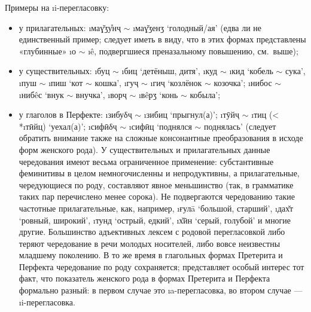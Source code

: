 Примеры на \i{i}-перегласовку:

\begin{itemize}
	\item{у прилагательных: \i{маɣ̌ӡу̊нҷ} $\sim$ \i{маɣ̌ӡенӡ} ‘голодный/ая’ (едва ли не единственный пример; следует иметь в виду, что в этих формах представлены «глубинные» \i{о} $\sim$ \i{ê}, подвергшиеся преназальному повышению, см.~выше);}
	\item{у существительных: \i{буц} $\sim$ \i{биц} ‘детёныш, дитя’, \i{куд} $\sim$ \i{кид} ‘кобель $\sim$ сука’, \i{пуш} $\sim$ \i{пиш} ‘кот $\sim$ кошка’, \i{гуҷ} $\sim$ \i{гиҷ} ‘козлёнок $\sim$ козочка’; \i{нибос} $\sim$ \i{нибêс} ‘внук $\sim$ внучка’, \i{ворҷ} $\sim$ \i{вêрӡ} ‘конь $\sim$ кобыла’;}
	\item{у глаголов в Перфекте: \i{зибуδҷ} $\sim$ \i{зибиц} ‘прыгнул(а)’; \i{тӯйҷ} $\sim$ \i{тиц} (< *\i{тӣйц}) ‘уехал(а)’; \i{сифӣδҷ} $\sim$ \i{сифӣц} ‘поднялся $\sim$ поднялась’ (следует обратить внимание также на сложные консонантные преобразования в исходе форм женского рода). У существительных и прилагательных данные чередования имеют весьма ограниченное применение: субстантивные феминитивы в целом немногочисленны и непродуктивны, а прилагательные, чередующиеся по роду, составляют явное меньшинство (так, в грамматике \parencite{karamshoev1963} таких пар перечислено менее сорока). Не подвергаются чередованию такие частотные прилагательные, как, например, \i{ғулā} ‘большой, старший’, \i{дах̌т} ‘ровный, широкий’, \i{тунд} ‘острый, едкий’, \i{х̌ӣн} ‘серый, голубой’ и многие другие. Большинство адъективных лексем с родовой перегласовкой либо теряют чередование в речи молодых носителей, либо вовсе неизвестны младшему поколению. В то же время в глагольных формах Претерита и Перфекта чередование по роду сохраняется; представляет особый интерес тот факт, что показатель женского рода в формах Претерита и Перфекта формально разный: в первом случае это \i{a}-перегласовка, во втором случае — \i{i}-перегласовка.}
\end{itemize}

